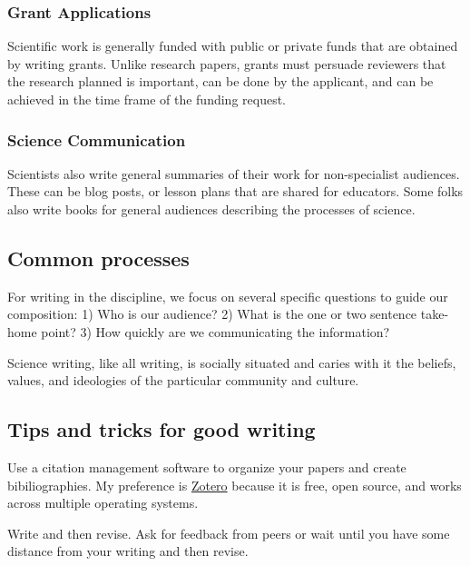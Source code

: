 \documentclass[11pt,]{article}
\begin{document}
\hypertarget{grant-applications}{%
\subsubsection{Grant Applications}\label{grant-applications}}

Scientific work is generally funded with public or private funds that
are obtained by writing grants. Unlike research papers, grants must
persuade reviewers that the research planned is important, can be done
by the applicant, and can be achieved in the time frame of the funding
request.

\hypertarget{science-communication}{%
\subsubsection{Science Communication}\label{science-communication}}

Scientists also write general summaries of their work for non-specialist
audiences. These can be blog posts, or lesson plans that are shared for
educators. Some folks also write books for general audiences describing
the processes of science.

\hypertarget{common-processes}{%
\subsection{Common processes}\label{common-processes}}

For writing in the discipline, we focus on several specific questions to
guide our composition: 1) Who is our audience? 2) What is the one or two
sentence take-home point? 3) How quickly are we communicating the
information?

Science writing, like all writing, is socially situated and caries with
it the beliefs, values, and ideologies of the particular community and
culture.

\hypertarget{tips-and-tricks-for-good-writing}{%
\subsection{Tips and tricks for good
writing}\label{tips-and-tricks-for-good-writing}}

Use a citation management software to organize your papers and create
bibiliographies. My preference is \href{https://www.zotero.org/}{Zotero}
because it is free, open source, and works across multiple operating
systems.

Write and then revise. Ask for feedback from peers or wait until you
have some distance from your writing and then revise.
\end{document}
